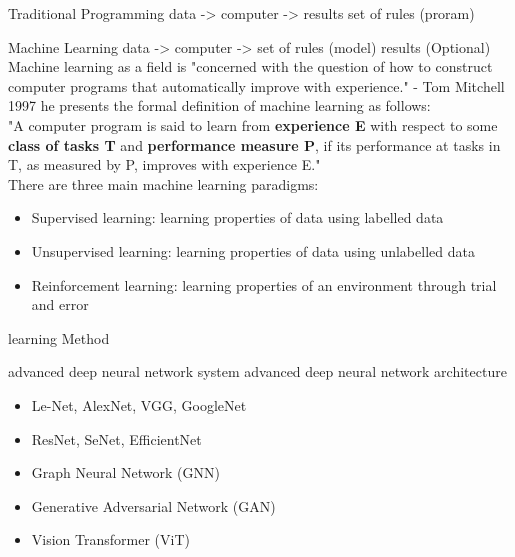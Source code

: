     Traditional Programming
    data
            -> computer -> results
    set of rules (proram)
        
    Machine Learning
    data
            -> computer -> set of rules (model)
    results (Optional)
\\
    Machine learning as a field is "concerned with the question of how to construct computer programs that automatically improve with experience." - Tom Mitchell
    1997 he presents the formal definition of machine learning as follows:\\
    "A computer program is said to learn from \textbf{experience E} with respect to some \textbf{class of tasks T} and \textbf{performance measure P}, if its performance at tasks in T, as measured by P, improves with experience E."\\
    There are three main machine learning paradigms:
    \begin{itemize}
        \item Supervised learning: learning properties of data using labelled data
        \item Unsupervised learning: learning properties of data using unlabelled data
        \item Reinforcement learning: learning properties of an environment through trial and error 
    \end{itemize}




learning Method


advanced deep neural network system
advanced deep neural network architecture
\begin{itemize}
    \item Le-Net, AlexNet, VGG, GoogleNet
    \item ResNet, SeNet, EfficientNet
    \item Graph Neural Network (GNN)
    \item Generative Adversarial Network (GAN)
    \item Vision Transformer (ViT)
\end{itemize}

